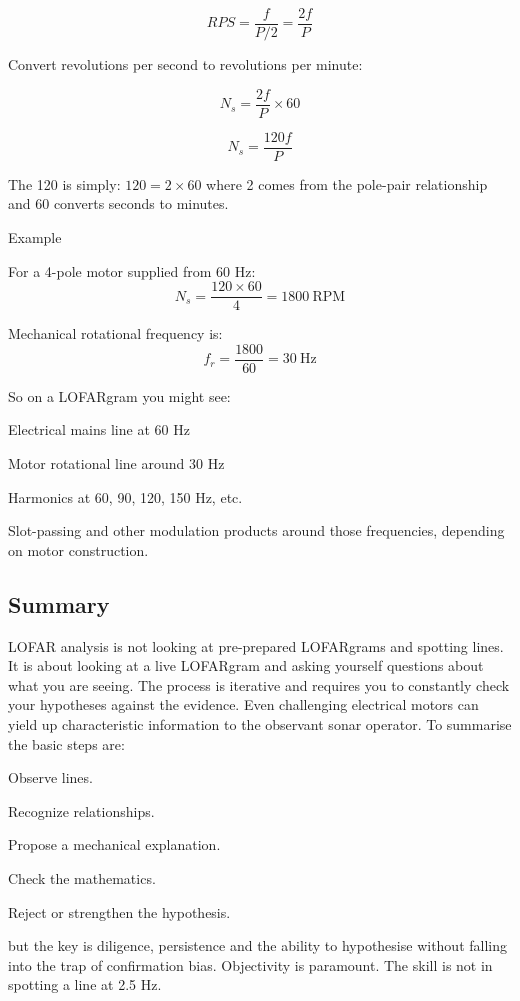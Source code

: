 \[
    RPS = \frac{f}{P/2} = \frac{2f}{P}          %
\]

Convert revolutions per second to revolutions per minute:

\[
    N_s = \frac{2f}{P} \times 60
\]

\[
    N_s = \frac{120f}{P}
\]

The 120 is simply: $120 = 2 \times 60$ where 2 comes from the pole-pair relationship and 60 converts seconds to minutes.

Example

For a 4-pole motor supplied from 60 Hz:
\[
    N_s = \frac{120\times60}{4} = 1800 \mathrm{ \ RPM}
\]


Mechanical rotational frequency is:
\[
    f_r=\frac{1800}{60} = 30 \mathrm{ \ Hz}
\]

So on a LOFARgram you might see:

\begin{compactitem}
    \item Electrical mains line at 60 Hz
    \item Motor rotational line around 30 Hz
    \item Harmonics at 60, 90, 120, 150 Hz, etc.
    \item Slot-passing and other modulation products around those frequencies, depending on motor construction.
\end{compactitem}

\subsection{Summary}

LOFAR analysis is not looking at pre-prepared LOFARgrams and spotting lines. It is about looking at a live LOFARgram and asking yourself questions about what you are seeing. The process is iterative and requires you to constantly check your hypotheses against the evidence. Even challenging electrical motors can yield up characteristic information to the observant sonar operator. To summarise the basic steps are:

\begin{compactenum}
    \item Observe lines.
    \item Recognize relationships.
    \item Propose a mechanical explanation.
    \item Check the mathematics.
    \item Reject or strengthen the hypothesis.
\end{compactenum}
but the key is diligence, persistence and the ability to hypothesise without falling into the trap of confirmation bias. Objectivity is paramount. The skill is not in spotting a line at 2.5 Hz.

